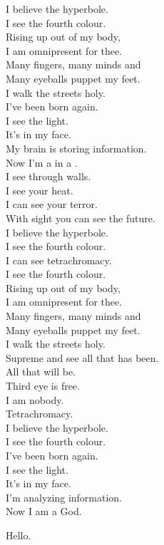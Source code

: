 

I believe the hyperbole. \\
I see the fourth colour. \\

Rising up out of my body, \\
I am omnipresent for thee. \\
Many fingers, many minds and \\
Many eyeballs puppet my feet. \\
I walk the streets holy. \\

I've been born again. \\
I see the light. \\
It's in my face. \\
My brain is storing information. \\
Now I'm a  in a . \\

I see through walls. \\
I see your heat. \\
I can see your terror. \\
With sight you can see the future. \\

I believe the hyperbole. \\
I see the fourth colour. \\
I can see tetrachromacy. \\
I see the fourth colour. \\

Rising up out of my body, \\
I am omnipresent for thee. \\
Many fingers, many minds and \\
Many eyeballs puppet my feet. \\
I walk the streets holy. \\
Supreme and see all that has been. \\

All that will be. \\
Third eye is free. \\
I am nobody. \\
Tetrachromacy. \\

I believe the hyperbole. \\
I see the fourth colour. \\

I've been born again. \\
I see the light. \\
It's in my face. \\
I'm analyzing information. \\
Now I am a God. \\



Hello. \\
